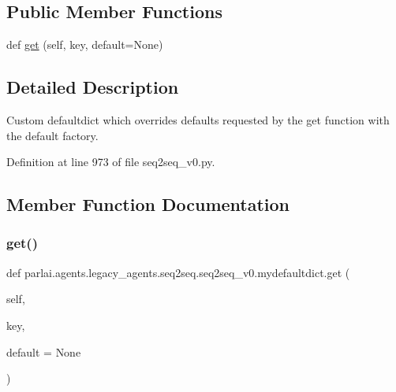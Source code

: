 \subsection*{Public Member Functions}
\begin{DoxyCompactItemize}
\item 
def \hyperlink{classparlai_1_1agents_1_1legacy__agents_1_1seq2seq_1_1seq2seq__v0_1_1mydefaultdict_a189be974031427bf68e4691307e2f2c2}{get} (self, key, default=None)
\end{DoxyCompactItemize}


\subsection{Detailed Description}
\begin{DoxyVerb}Custom defaultdict which overrides defaults requested by the get function with the
default factory.
\end{DoxyVerb}
 

Definition at line 973 of file seq2seq\+\_\+v0.\+py.



\subsection{Member Function Documentation}
\mbox{\label{classparlai_1_1agents_1_1legacy__agents_1_1seq2seq_1_1seq2seq__v0_1_1mydefaultdict_a189be974031427bf68e4691307e2f2c2}} 
\subsubsection{\texorpdfstring{get()}{get()}}
{\footnotesize\ttfamily def parlai.\+agents.\+legacy\+\_\+agents.\+seq2seq.\+seq2seq\+\_\+v0.\+mydefaultdict.\+get (\begin{DoxyParamCaption}\item[{}]{self,  }\item[{}]{key,  }\item[{}]{default = {\ttfamily None} }\end{DoxyParamCaption})}



